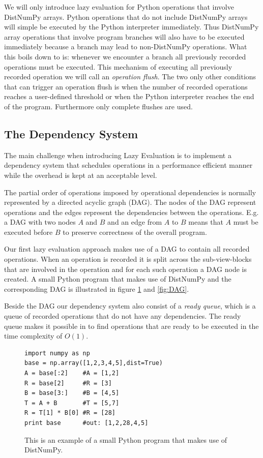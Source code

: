 \documentclass[preprint]{../PGAS10/sigplanconf}
\begin{document}
We will only introduce lazy evaluation for Python operations that involve DistNumPy arrays. Python operations that do not include DistNumPy arrays will simple be executed by the Python interpreter immediately. Thus DistNumPy array operations that involve program branches will also have to be executed immediately because a branch may lead to non-DistNumPy operations. What this boils down to is: whenever we encounter a branch all previously recorded operations must be executed. This mechanism of executing all previously recorded operation we will call an \emph{operation flush}. The two only other conditions that can trigger an operation flush is when the number of recorded operations reaches a user-defined threshold or when the Python interpreter reaches the end of the program. Furthermore only complete flushes are used.


\subsection{The Dependency System}
The main challenge when introducing Lazy Evaluation is to implement a dependency system that schedules operations in a performance efficient manner while the overhead is kept at an acceptable level.

The partial order of operations imposed by operational dependencies is normally represented by a directed acyclic graph (DAG)\cite{AhSeUl86}. The nodes of the DAG represent operations and the edges represent the dependencies between the operations. E.g. a DAG with two nodes $A$ and $B$ and an edge from $A$ to $B$ means that $A$ must be executed before $B$ to preserve correctness of the overall program. 

Our first lazy evaluation approach makes use of a DAG to contain all recorded operations. When an operation is recorded it is split across the sub-view-blocks that are involved in the operation and for each such operation a DAG node is created. A small Python program that makes use of DistNumPy and the corresponding DAG is illustrated in figure \ref{lst:code_eg} and \ref{fig:DAG}. 

Beside the DAG our dependency system also consist of a \emph{ready queue}, which is a queue of recorded operations that do not have any dependencies. The ready queue makes it possible in to find operations that are ready to be executed in the time complexity of $O(1)$.

\begin{figure}
\begin{lstlisting}
import numpy as np
base = np.array([1,2,3,4,5],dist=True)
A = base[:2]    #A = [1,2]
R = base[2]     #R = [3]
B = base[3:]    #B = [4,5]
T = A + B       #T = [5,7]
R = T[1] * B[0] #R = [28]
print base      #out: [1,2,28,4,5]
\end{lstlisting}
 \caption{This is an example of a small Python program that makes use of DistNumPy.}
 \label{lst:code_eg}
\end{figure}
\end{document}
